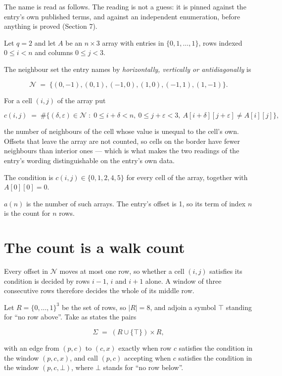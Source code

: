 \documentclass[11pt]{article}
\theoremstyle{definition}
\begin{document}
The name is read as follows. The reading is not a guess: it is pinned against the entry's own published terms, and against an independent enumeration, before anything is proved (Section 7).

Let $q = 2$ and let $A$ be an $n \times 3$ array with entries in $\{0,1,\dots,1\}$, rows indexed $0 \le i < n$ and columns $0 \le j < 3$.

The neighbour set the entry names by {\itshape horizontally, vertically or antidiagonally} is

\[\mathcal{N} \;=\; \{(0,-1), (0,1), (-1,0), (1,0), (-1,1), (1,-1)\}.\]

For a cell $(i,j)$ of the array put

\[c(i,j) \;=\; \#\bigl\{(\delta,\varepsilon)\in\mathcal{N} \;:\; 0\le i+\delta<n,\ 0\le j+\varepsilon<3,\ A[i+\delta][j+\varepsilon] \neq A[i][j]\bigr\},\]

the number of neighbours of the cell whose value is unequal to the cell's own. Offsets that leave the array are not counted, so cells on the border have fewer neighbours than interior ones --- which is what makes the two readings of the entry's wording distinguishable on the entry's own data.

The condition is $c(i,j) \in \{0, 1, 2, 4, 5\}$ for every cell of the array, together with $A[0][0]=0$.

$a(n)$ is the number of such arrays. The entry's offset is 1, so its term of index $n$ is the count for $n$ rows.

\section{The count is a walk count}

Every offset in $\mathcal{N}$ moves at most one row, so whether a cell $(i,j)$ satisfies its condition is decided by rows $i-1$, $i$ and $i+1$ alone. A window of three consecutive rows therefore decides the whole of its middle row.

Let $R = \{0,\dots,1\}^{3}$ be the set of rows, so $|R| = 8$, and adjoin a symbol $\top$ standing for ``no row above''. Take as states the pairs

\[\Sigma \;=\; (R \cup \{\top\}) \times R,\]

with an edge from $(p,c)$ to $(c,x)$ exactly when row $c$ satisfies the condition in the window $(p,c,x)$, and call $(p,c)$ accepting when $c$ satisfies the condition in the window $(p,c,\bot)$, where $\bot$ stands for ``no row below''.
\end{document}
